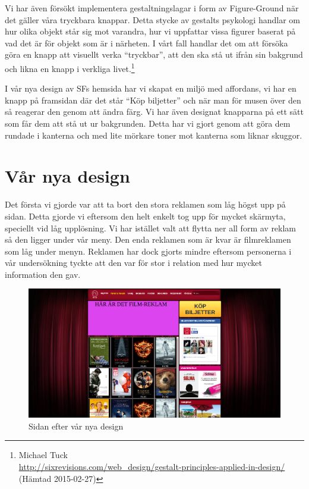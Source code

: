 \documentclass[swedish,a4paper,11pt]{article}
\begin{document}
Vi har även försökt implementera gestaltningslagar i form av Figure-Ground när det gäller våra tryckbara knappar. Detta stycke av gestalts psykologi handlar om hur olika objekt står sig mot varandra, hur vi uppfattar vissa figurer baserat på vad det är för objekt som är i närheten. I vårt fall handlar det om att försöka göra en knapp att visuellt verka “tryckbar”, att den ska stå ut ifrån sin bakgrund och likna en knapp i verkliga livet.\footnote{Michael Tuck\\ \url{http://sixrevisions.com/web_design/gestalt-principles-applied-in-design/}\\ (Hämtad 2015-02-27)}

 I vår nya design av SFs hemsida har vi skapat en miljö med affordans, vi har en knapp på framsidan där det står “Köp biljetter” och när man för musen över den så reagerar den genom att ändra färg. Vi har även designat knapparna på ett sätt som får dem att stå ut ur bakgrunden. Detta har vi gjort genom att göra dem rundade i kanterna och med lite mörkare toner mot kanterna som liknar skuggor.

\newpage
\section{Vår nya design} 
Det första vi gjorde var att ta bort den stora reklamen som låg högst upp på sidan. Detta gjorde vi eftersom den helt enkelt tog upp för mycket skärmyta, speciellt vid låg upplösning. Vi har istället valt att flytta ner all form av reklam så den ligger under vår meny. Den enda reklamen som är kvar är filmreklamen som låg under menyn. Reklamen har dock gjorts mindre eftersom personerna i vår undersökning tyckte att den var för stor i relation med hur mycket information den gav.
\noindent

\begin{figure}[H]
\centering
\includegraphics[scale=0.20]{ourdesign.png} 
\caption{Sidan efter vår nya design}
\end{figure}
\end{document}
